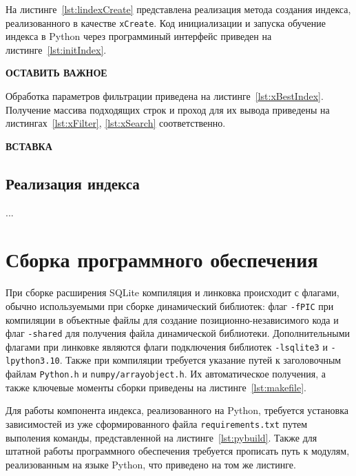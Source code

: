 На листинге~\ref{lst:lindexCreate} представлена реализация метода создания
индекса, реализованного в качестве \texttt{xCreate}. Код инициализации и запуска
обучение индекса в Python через программиный интерфейс приведен на
листинге~\ref{lst:initIndex}.

\textbf{ОСТАВИТЬ ВАЖНОЕ}



Обработка параметров фильтрации приведена на листинге~\ref{lst:xBestIndex}.
Получение массива подходящих строк и проход для их вывода приведены на
листингах~\ref{lst:xFilter}, \ref{lst:xSearch} соответственно.




\textbf{ВСТАВКА}

\subsection{Реализация индекса}

...

\section{Сборка программного обеспечения}

При сборке расширения SQLite компиляция и линковка происходит с флагами,
обычно используемыми при сборке динамический библиотек: флаг \texttt{-fPIC} при
компиляции в объектные файлы для создание позиционно-независимого кода и флаг
\texttt{-shared} для получения файла динамической библиотеки. Дополнительными
флагами при линковке являются флаги подключения библиотек \texttt{-lsqlite3} и
\texttt{-lpython3.10}. Также при компиляции требуется указание путей к
заголовочным файлам \texttt{Python.h} и \texttt{numpy/arrayobject.h}. Их
автоматическое получения, а также ключевые моменты сборки приведены на
листинге~\ref{lst:makefile}.


Для работы компонента индекса, реализованного на Python, требуется установка
зависимостей из уже сформированного файла \texttt{requirements.txt} путем
выполения команды, представленной на листинге~\ref{lst:pybuild}. Также для
штатной работы программного обеспечения требуется прописать путь к модулям,
реализованным на языке Python, что приведено на том же листинге.

